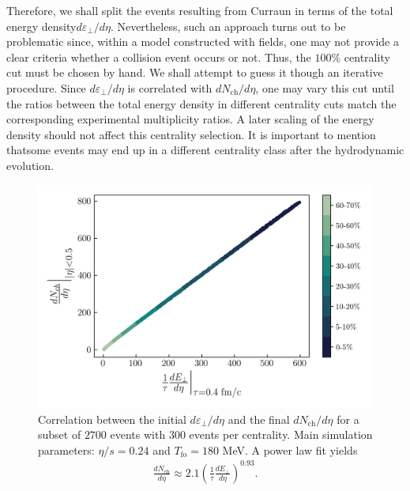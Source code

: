 Therefore, we shall split the events resulting from {\sffamily Curraun} in terms of the total energy density$d\varepsilon_\perp/d\eta$. Nevertheless, such an approach turns out to be problematic since, within a model constructed with fields, one may not provide a clear criteria whether a collision event occurs or not. Thus, the $100\%$ centrality cut must be chosen by hand. We shall attempt to guess it though an iterative procedure. Since $d\varepsilon_\perp/d\eta$ is correlated with $dN_\text{ch}/d\eta$, one may vary this cut until the ratios between the total energy density in different centrality cuts match the corresponding experimental multiplicity ratios. A later scaling of the energy density should not affect this centrality selection. It is important to mention thatsome events may end up in a different centrality class after the hydrodynamic evolution.

\begin{figure}[!hbt]
	\includegraphics[width=\textwidth]{images/dnch_etot.png}
	\caption{\normalsize Correlation between the initial $d\varepsilon_\perp/d\eta$ and the final $dN_\mathrm{ch}/d\eta$ for a subset of $2700$ events with $300$ events per centrality. Main simulation parameters: $\eta/s=0.24$ and $T_\mathrm{fo}=180$ MeV. A power law fit yields
	\begin{align*}
	    \frac{dN_\text{ch}}{d\eta}\approx 2.1 \left(\frac{1}{\tau}\frac{dE_\perp}{d\eta}\right)^{0.93}.
	\end{align*}
	} 
\end{figure}

